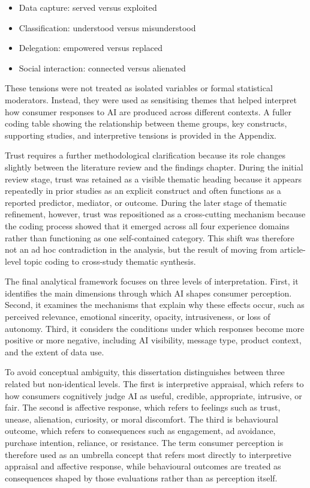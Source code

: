\begin{itemize}
    \item Data capture: served versus exploited
    \item Classification: understood versus misunderstood
    \item Delegation: empowered versus replaced
    \item Social interaction: connected versus alienated
\end{itemize}

These tensions were not treated as isolated variables or formal statistical moderators. Instead, they were used as sensitising themes that helped interpret how consumer responses to AI are produced across different contexts. A fuller coding table showing the relationship between theme groups, key constructs, supporting studies, and interpretive tensions is provided in the Appendix.

Trust requires a further methodological clarification because its role changes slightly between the literature review and the findings chapter. During the initial review stage, trust was retained as a visible thematic heading because it appears repeatedly in prior studies as an explicit construct and often functions as a reported predictor, mediator, or outcome. During the later stage of thematic refinement, however, trust was repositioned as a cross-cutting mechanism because the coding process showed that it emerged across all four experience domains rather than functioning as one self-contained category. This shift was therefore not an ad hoc contradiction in the analysis, but the result of moving from article-level topic coding to cross-study thematic synthesis.

The final analytical framework focuses on three levels of interpretation. First, it identifies the main dimensions through which AI shapes consumer perception. Second, it examines the mechanisms that explain why these effects occur, such as perceived relevance, emotional sincerity, opacity, intrusiveness, or loss of autonomy. Third, it considers the conditions under which responses become more positive or more negative, including AI visibility, message type, product context, and the extent of data use.

To avoid conceptual ambiguity, this dissertation distinguishes between three related but non-identical levels. The first is interpretive appraisal, which refers to how consumers cognitively judge AI as useful, credible, appropriate, intrusive, or fair. The second is affective response, which refers to feelings such as trust, unease, alienation, curiosity, or moral discomfort. The third is behavioural outcome, which refers to consequences such as engagement, ad avoidance, purchase intention, reliance, or resistance. The term consumer perception is therefore used as an umbrella concept that refers most directly to interpretive appraisal and affective response, while behavioural outcomes are treated as consequences shaped by those evaluations rather than as perception itself.


